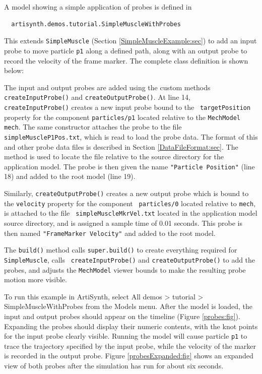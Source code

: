 A model showing a simple application of probes is defined in
%
\begin{verbatim}
  artisynth.demos.tutorial.SimpleMuscleWithProbes
\end{verbatim}
%
This extends {\tt SimpleMuscle} (Section
\ref{SimpleMuscleExample:sec}) to add an input probe to move particle
{\tt p1} along a defined path, along with an output probe to record
the velocity of the frame marker.  The complete class definition is
shown below:
%
\lstset{numbers=left}

\lstset{numbers=none}
%
The input and output probes are added using the custom methods {\tt
createInputProbe()} and {\tt createOutputProbe()}. At line 14, {\tt
createInputProbe()} creates a new input probe bound to the {\tt
targetPosition} property for the component {\tt particles/p1} located
relative to the {\tt MechModel} {\tt mech}. The same constructor
attaches the probe to the file\\ {\tt simpleMuscleP1Pos.txt}, which is
read to load the probe data. The format of this and other probe data
files is described in Section \ref{DataFileFormat:sec}.  The method
is used to locate the file relative to the source directory for the
application model. The probe is then given the name {\tt "Particle
Position"} (line 18) and added to the root model (line 19).

Similarly, {\tt createOutputProbe()} creates a new output probe which
is bound to the {\tt velocity} property for the component {\tt
particles/0} located relative to {\tt mech}, is attached to the file {\tt
simpleMuscleMkrVel.txt} located in the application model source
directory, and is assigned a sample time of 0.01 seconds. This probe is
then named {\tt "FrameMarker Velocity"} and added to the root model.

The {\tt build()} method calls {\tt super.build()} to create
everything required for {\tt SimpleMuscle}, calls {\tt
createInputProbe()} and {\tt createOutputProbe()} to add the probes,
and adjusts the {\tt MechModel} viewer bounds to make the resulting
probe motion more visible.

To run this example in ArtiSynth, select {\sf All demos > tutorial >
SimpleMuscleWithProbes} from the {\sf Models} menu. After the model is
loaded, the input and output probes should appear on the timeline
(Figure \ref{probes:fig}). Expanding the probes should display their
numeric contents, with the knot points for the input probe clearly
visible.  Running the model will cause particle {\tt p1} to trace the
trajectory specified by the input probe, while the velocity of the
marker is recorded in the output probe. Figure
\ref{probesExpanded:fig} shows an expanded view of both probes after
the simulation has run for about six seconds.


